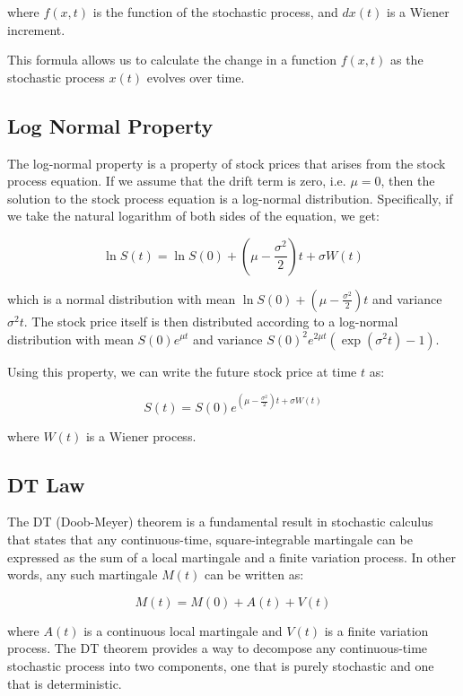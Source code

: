 \documentclass{article}
\theoremstyle{mytheoremstyle}
\theoremstyle{mytheoremstyle}
\theoremstyle{myproblemstyle}
\begin{document}
where $f(x,t)$ is the function of the stochastic process, and $dx(t)$ is a Wiener increment.

This formula allows us to calculate the change in a function $f(x,t)$ as the stochastic process $x(t)$ evolves over time.

\subsection{Log Normal Property}
The log-normal property is a property of stock prices that arises from the stock process equation. If we assume that the drift term is zero, i.e. $\mu=0$, then the solution to the stock process equation is a log-normal distribution. Specifically, if we take the natural logarithm of both sides of the equation, we get:

\begin{equation}
\ln S(t) = \ln S(0) + \left( \mu - \frac{\sigma^2}{2} \right) t + \sigma W(t)
\end{equation}

which is a normal distribution with mean $\ln S(0) + \left( \mu - \frac{\sigma^2}{2} \right) t$ and variance $\sigma^2 t$. The stock price itself is then distributed according to a log-normal distribution with mean $S(0)e^{\mu t}$ and variance $S(0)^2 e^{2\mu t} (\exp(\sigma^2 t) -1)$.

Using this property, we can write the future stock price at time $t$ as:

\begin{equation}
S(t) = S(0)e^{(\mu-\frac{\sigma^2}{2})t + \sigma W(t)}
\end{equation}

where $W(t)$ is a Wiener process.

\subsection{DT Law}
The DT (Doob-Meyer) theorem is a fundamental result in stochastic calculus that states that any continuous-time, square-integrable martingale can be expressed as the sum of a local martingale
and a finite variation process. In other words, any such martingale $M(t)$ can be written as:

\begin{equation}
M(t) = M(0) + A(t) + V(t)
\end{equation}

where $A(t)$ is a continuous local martingale and $V(t)$ is a finite variation process. The DT theorem provides a way to decompose any continuous-time stochastic process into two components, one that is purely stochastic and one that is deterministic.
\end{document}
